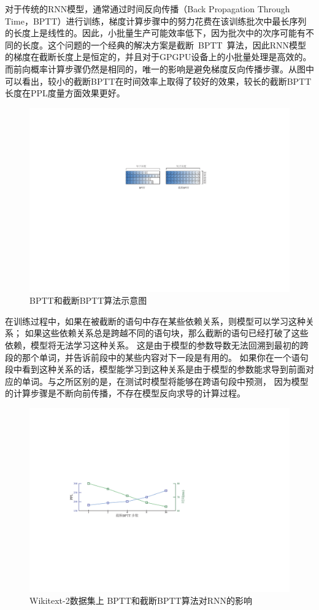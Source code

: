 对于传统的RNN模型，通常通过时间反向传播（Back Propagation Through Time，BPTT）进行训练，梯度计算步骤中的努力花费在该训练批次中最长序列的长度上是线性的。因此，小批量生产可能效率低下，因为批次中的次序可能有不同的长度。这个问题的一个经典的解决方案是截断~BPTT~算法，因此RNN模型的梯度在截断长度上是恒定的，并且对于GPGPU设备上的小批量处理是高效的。而前向概率计算步骤仍然是相同的，唯一的影响是避免梯度反向传播步骤。从图中可以看出，较小的截断BPTT在时间效率上取得了较好的效果，较长的截断BPTT长度在PPL度量方面效果更好。
\begin{figure}[!ht]
  \centering
  \includegraphics[width=.8\columnwidth]{./figures/minibatch.pdf}
  \caption{BPTT和截断BPTT算法示意图}\label{fig:minibatch}
\end{figure}

在训练过程中，如果在被截断的语句中存在某些依赖关系，则模型可以学习这种关系； 如果这些依赖关系总是跨越不同的语句块，那么截断的语句已经打破了这些依赖，模型将无法学习这种关系。 这是由于模型的参数导数无法回溯到最初的跨段的那个单词，并告诉前段中的某些内容对下一段是有用的。 如果你在一个语句段中看到这种关系的话，模型能学习到这种关系是由于模型的参数能求导到前面对应的单词。与之所区别的是，在测试时模型将能够在跨语句段中预测， 因为模型的计算步骤是不断向前传播，不存在模型反向求导的计算过程。
\begin{figure}[!ht]
  \centering
  \includegraphics[width=.85\columnwidth]{./figures/tbptt.pdf}
  \caption{Wikitext-2数据集上 BPTT和截断BPTT算法对RNN的影响}\label{fig:tbptt}
\end{figure}
